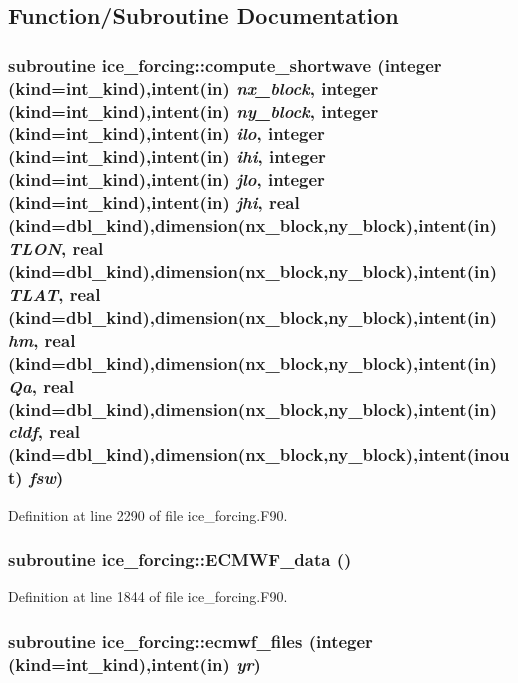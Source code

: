 \subsection{Function/Subroutine Documentation}
\hypertarget{namespaceice__forcing_af98a1525343c579e040a9dfd3493ada4}{
\subsubsection[{compute\_\-shortwave}]{\setlength{\rightskip}{0pt plus 5cm}subroutine ice\_\-forcing::compute\_\-shortwave (integer (kind=int\_\-kind),intent(in) {\em nx\_\-block}, \/  integer (kind=int\_\-kind),intent(in) {\em ny\_\-block}, \/  integer (kind=int\_\-kind),intent(in) {\em ilo}, \/  integer (kind=int\_\-kind),intent(in) {\em ihi}, \/  integer (kind=int\_\-kind),intent(in) {\em jlo}, \/  integer (kind=int\_\-kind),intent(in) {\em jhi}, \/  real (kind=dbl\_\-kind),dimension(nx\_\-block,ny\_\-block),intent(in) {\em TLON}, \/  real (kind=dbl\_\-kind),dimension(nx\_\-block,ny\_\-block),intent(in) {\em TLAT}, \/  real (kind=dbl\_\-kind),dimension(nx\_\-block,ny\_\-block),intent(in) {\em hm}, \/  real (kind=dbl\_\-kind),dimension(nx\_\-block,ny\_\-block),intent(in) {\em Qa}, \/  real (kind=dbl\_\-kind),dimension(nx\_\-block,ny\_\-block),intent(in) {\em cldf}, \/  real (kind=dbl\_\-kind),dimension(nx\_\-block,ny\_\-block),intent(inout) {\em fsw})}}
\label{namespaceice__forcing_af98a1525343c579e040a9dfd3493ada4}


Definition at line 2290 of file ice\_\-forcing.F90.\hypertarget{namespaceice__forcing_a7d343f266bce5c9e7a7062d07fc3b57e}{
\subsubsection[{ECMWF\_\-data}]{\setlength{\rightskip}{0pt plus 5cm}subroutine ice\_\-forcing::ECMWF\_\-data ()}}
\label{namespaceice__forcing_a7d343f266bce5c9e7a7062d07fc3b57e}


Definition at line 1844 of file ice\_\-forcing.F90.\hypertarget{namespaceice__forcing_adbed1e81d23690718cc666b6bb1c964e}{
\subsubsection[{ecmwf\_\-files}]{\setlength{\rightskip}{0pt plus 5cm}subroutine ice\_\-forcing::ecmwf\_\-files (integer (kind=int\_\-kind),intent(in) {\em yr})}}
\label{namespaceice__forcing_adbed1e81d23690718cc666b6bb1c964e}


